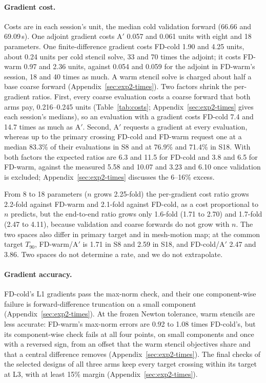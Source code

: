 \paragraph{Gradient cost.}
Costs are in each session's unit, the median cold validation forward (66.66
and 69.09\,s). One adjoint gradient costs A$'$ 0.057 and 0.061 units with
eight and 18 parameters. One finite-difference gradient costs FD-cold 1.90 and
4.25 units, about 0.24 units per cold stencil solve, 33 and 70 times the
adjoint; it costs FD-warm 0.97 and 2.36 units, against 0.054 and 0.059 for
the adjoint in FD-warm's session, 18 and 40 times as much. A warm
stencil solve is charged about half a base coarse forward
(Appendix~\ref{sec:exp2-times}). Two factors shrink the per-gradient ratios. First, every coarse
evaluation costs a coarse forward that both arms pay, 0.216--0.245 units
(Table~\ref{tab:costs}; Appendix~\ref{sec:exp2-times} gives each session's
medians), so an evaluation with a gradient costs FD-cold 7.4 and 14.7
times as much as A$'$. Second, A$'$
requests a gradient at every evaluation, whereas up to the primary
crossing FD-cold and FD-warm request one at a median 83.3\% of their evaluations
in S8 and at 76.9\% and 71.4\% in S18. With both factors the expected
ratios are 6.3 and 11.5 for FD-cold and 3.8 and 6.5 for FD-warm, against the
measured 5.58 and 10.07 and 3.23 and 6.10 once validation is excluded;
Appendix~\ref{sec:exp2-times} discusses the 6--16\% excess.

From 8 to 18 parameters ($n$ grows 2.25-fold) the per-gradient cost ratio
grows 2.2-fold against FD-warm and 2.1-fold against FD-cold, as a cost
proportional to $n$ predicts, but the end-to-end ratio grows only
1.6-fold (1.71 to 2.70) and 1.7-fold (2.47 to 4.11), because validation
and coarse forwards do not grow with $n$. The two spaces also differ in
primary target and in mesh-motion map; at the common target $T_{90}$,
FD-warm/A$'$ is 1.71 in S8 and 2.59 in S18, and FD-cold/A$'$ 2.47 and
3.86. Two spaces do not determine a rate, and we do not extrapolate.

\paragraph{Gradient accuracy.}
FD-cold's L1 gradients pass the max-norm check, and their one component-wise
failure is forward-difference truncation on a small component
(Appendix~\ref{sec:exp2-times}). At the frozen Newton tolerance, warm
stencils are less accurate: FD-warm's max-norm errors are 0.92 to 1.08
times FD-cold's, but its component-wise check fails at all four points, on
small components and once with a reversed sign, from an offset that the
warm stencil objectives share and that a central difference removes
(Appendix~\ref{sec:exp2-times}). The final checks of the selected
designs of all three arms keep every target crossing within its target at
L3, with at least 15\% margin (Appendix~\ref{sec:exp2-times}).